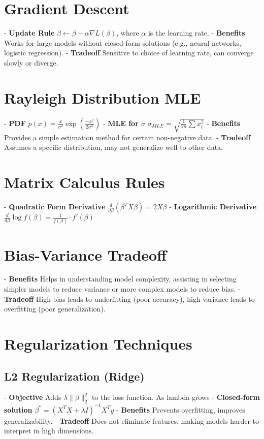 \documentclass[10pt]{article}
\begin{document}
\begin{multicols}{2}
\section*{Gradient Descent}
- \textbf{Update Rule} $\beta \leftarrow \beta - \alpha\nabla L(\beta)$, where $\alpha$ is the learning rate.
- \textbf{Benefits} Works for large models without closed-form solutions (e.g., neural networks, logistic regression).
- \textbf{Tradeoff} Sensitive to choice of learning rate, can converge slowly or diverge.

\section*{Rayleigh Distribution MLE}
- \textbf{PDF} $p(x) = \frac{x}{\sigma^2} \exp\left( \frac{-x^2}{2\sigma^2} \right)$
- \textbf{MLE for $\sigma$} $\sigma_{MLE} = \sqrt{\frac{1}{2n} \sum x_i^2}$
- \textbf{Benefits} Provides a simple estimation method for certain non-negative data.
- \textbf{Tradeoff} Assumes a specific distribution, may not generalize well to other data.

\section*{Matrix Calculus Rules}
- \textbf{Quadratic Form Derivative} $\frac{d}{d\beta} \left( \beta^T X \beta \right) = 2X\beta$
- \textbf{Logarithmic Derivative} $\frac{d}{d\beta} \log f(\beta) = \frac{1}{f(\beta)} \cdot f'(\beta)$

\section*{Bias-Variance Tradeoff}
- \textbf{Benefits} Helps in understanding model complexity, assisting in selecting simpler models to reduce variance or more complex models to reduce bias.
- \textbf{Tradeoff} High bias leads to underfitting (poor accuracy), high variance leads to overfitting (poor generalization).

\section*{Regularization Techniques}
\subsection*{L2 Regularization (Ridge)}
- \textbf{Objective} Adds $\lambda \|\beta\|_2^2$ to the loss function. As lambda grows
- \textbf{Closed-form solution} $\beta^* = (X^TX + \lambda I)^{-1}X^Ty$
- \textbf{Benefits} Prevents overfitting, improves generalizability.
- \textbf{Tradeoff} Does not eliminate features, making models harder to interpret in high dimensions.


\end{multicols}
\end{document}
